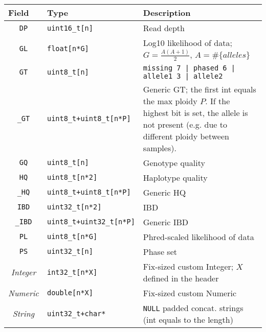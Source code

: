 \documentclass[10pt,pdftex]{article}
\begin{document}
\begin{center}
\begin{tabular}{clp{9cm}}
\hline
\multicolumn{1}{l}{\bf Field} & \multicolumn{1}{l}{\bf Type} & \multicolumn{1}{l}{\bf Description} \\\hline
{\tt DP} & {\tt uint16\_t[n]} & Read depth \\
{\tt GL} & {\tt float[n*G]} & Log10 likelihood of data; $G=\frac{A(A+1)}{2}$, $A=\#\{alleles\}$\\
{\tt GT} & {\tt uint8\_t[n]} & {\tt missing\char60\char60 7 | phased\char60\char60 6 | allele1\char60\char60 3 | allele2} \\
{\tt \_GT} & {\tt uint8\_t+uint8\_t[n*P]} & {Generic GT; the first int equals the max ploidy $P$. If the highest bit is set,
	the allele is not present (e.g. due to different ploidy between samples).} \\
{\tt GQ} & {\tt uint8\_t[n]} & {Genotype quality}\\
{\tt HQ} & {\tt uint8\_t[n*2]} & {Haplotype quality}\\
{\tt \_HQ} & {\tt uint8\_t+uint8\_t[n*P]} & {Generic HQ}\\
{\tt IBD} & {\tt uint32\_t[n*2]} & {IBD}\\
{\tt \_IBD} & {\tt uint8\_t+uint32\_t[n*P]} & {Generic IBD}\\
{\tt PL} & {\tt uint8\_t[n*G]} & {Phred-scaled likelihood of data}\\
{\tt PS} & {\tt uint32\_t[n]} & {Phase set}\\
\emph{Integer} & {\tt int32\_t[n*X]} & {Fix-sized custom Integer; $X$ defined in the header}\\
\emph{Numeric} & {\tt double[n*X]} & {Fix-sized custom Numeric}\\
\emph{String} & {\tt uint32\_t+char*} & {\tt NULL} padded concat. strings (int equals to the length) \\
\hline
\end{tabular}
\end{center}
\end{document}
